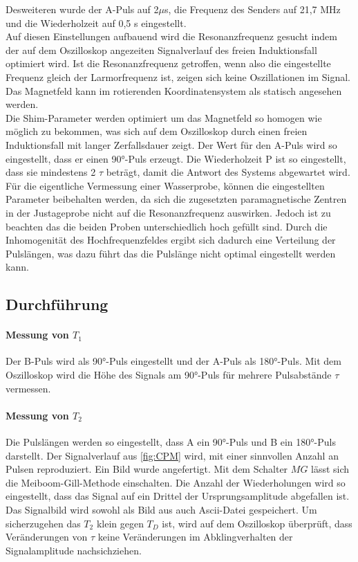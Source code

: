 Desweiteren wurde der A-Puls auf 2$\mu$s, die Frequenz des Senders auf 21,7 MHz und die
Wiederholzeit auf 0,5 s eingestellt.\\
Auf diesen Einstellungen aufbauend wird die Resonanzfrequenz gesucht indem
der auf dem Oszilloskop angezeiten Signalverlauf des freien Induktionsfall optimiert
wird. Ist die Resonanzfrequenz getroffen, wenn also die eingestellte Frequenz gleich
der Larmorfrequenz ist, zeigen sich keine Oszillationen im Signal. Das Magnetfeld
kann im rotierenden Koordinatensystem als statisch angesehen werden.\\
Die Shim-Parameter werden optimiert um das Magnetfeld so homogen wie möglich zu bekommen,
was sich auf dem Oszilloskop durch einen freien Induktionsfall mit langer Zerfallsdauer
zeigt. Der Wert für den A-Puls wird so eingestellt, dass er einen 90°-Puls
erzeugt. Die Wiederholzeit P  ist so eingestellt, dass sie mindestens 2 $\tau$ beträgt,
damit die Antwort des Systems abgewartet wird.\\
Für die eigentliche Vermessung einer Wasserprobe, können die eingestellten Parameter
beibehalten werden, da sich die zugesetzten paramagnetische Zentren in der
Justageprobe nicht auf die Resonanzfrequenz auswirken. Jedoch ist
zu beachten das die beiden Proben unterschiedlich hoch gefüllt sind. Durch die
Inhomogenität des Hochfrequenzfeldes ergibt sich dadurch eine Verteilung
der Pulslängen, was dazu führt das die Pulslänge nicht optimal eingestellt werden kann.
\subsection{Durchführung}
\paragraph{Messung von $T_1$} Der B-Puls wird als 90°-Puls eingestellt und
der A-Puls als 180°-Puls. Mit dem Oszilloskop wird die Höhe des Signals am
90°-Puls für mehrere Pulsabstände $\tau$ vermessen.
\paragraph{Messung von $T_2$}
Die Pulslängen werden so eingestellt, dass A ein 90°-Puls und B ein 180°-Puls
darstellt. Der Signalverlauf aus \ref{fig:CPM} wird, mit einer sinnvollen
Anzahl an Pulsen reproduziert. Ein Bild wurde angefertigt.
Mit dem Schalter $MG$ lässt sich die Meiboom-Gill-Methode einschalten. Die Anzahl
der Wiederholungen wird so eingestellt, dass das Signal auf ein Drittel
der Ursprungsamplitude abgefallen ist. Das Signalbild wird
sowohl als Bild aus auch Ascii-Datei gespeichert. Um sicherzugehen
das $T_2$ klein gegen $T_D$ ist, wird auf dem Oszilloskop überprüft, dass Veränderungen
von $\tau$ keine Veränderungen im Abklingverhalten der Signalamplitude nachsichziehen.
